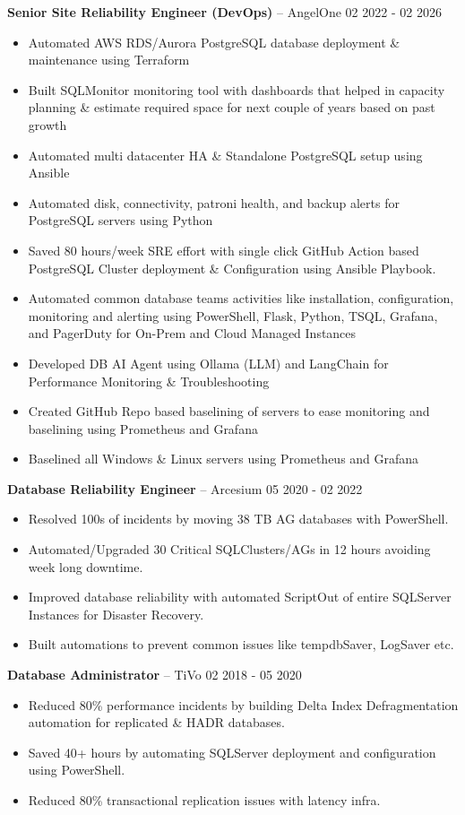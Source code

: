\documentclass[10pt,a4paper]{article}
\begin{document}
\textbf{Senior Site Reliability Engineer (DevOps)} -- AngelOne \hfill 02 2022 - 02 2026
\begin{itemize}
  \item Automated AWS RDS/Aurora PostgreSQL database deployment \& maintenance using Terraform
  \item Built SQLMonitor monitoring tool with dashboards that helped in capacity planning \& estimate required space for next couple of years based on past growth
  \item Automated multi datacenter HA \& Standalone PostgreSQL setup using Ansible
  \item Automated disk, connectivity, patroni health, and backup alerts for PostgreSQL servers using Python
  \item Saved 80 hours/week SRE effort with single click GitHub Action based PostgreSQL Cluster deployment \& Configuration using Ansible Playbook.
  \item Automated common database teams activities like installation, configuration, monitoring and alerting using PowerShell, Flask, Python, TSQL, Grafana, and PagerDuty for On-Prem and Cloud Managed Instances
  \item Developed DB AI Agent using Ollama (LLM) and LangChain for Performance Monitoring \& Troubleshooting
  \item Created GitHub Repo based baselining of servers to ease monitoring and baselining using Prometheus and Grafana
  \item Baselined all Windows \& Linux servers using Prometheus and Grafana
\end{itemize}

\textbf{Database Reliability Engineer} -- Arcesium \hfill 05 2020 - 02 2022
\begin{itemize}
  \item Resolved 100s of incidents by moving 38 TB AG databases with PowerShell.
  \item Automated/Upgraded 30 Critical SQLClusters/AGs in 12 hours avoiding week long downtime.
  \item Improved database reliability with automated ScriptOut of entire SQLServer Instances for Disaster Recovery.
  \item Built automations to prevent common issues like tempdbSaver, LogSaver etc.
\end{itemize}

\textbf{Database Administrator} -- TiVo \hfill 02 2018 - 05 2020
\begin{itemize}
  \item Reduced 80\% performance incidents by building Delta Index Defragmentation automation for replicated \& HADR databases.
  \item Saved 40+ hours by automating SQLServer deployment and configuration using PowerShell.
  \item Reduced 80\% transactional replication issues with latency infra.
\end{itemize}
\end{document}
